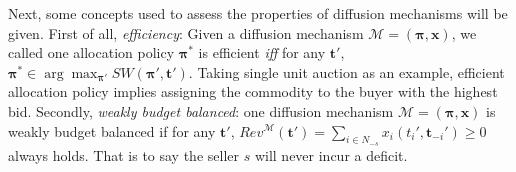 \documentclass{article}
\newtheorem{definition}{Definition}
\begin{document}
Next, some concepts used to assess the properties of diffusion mechanisms will be given. First of all, \textit{efficiency}: Given a diffusion mechanism $\mathcal{M}=(\boldsymbol{\pi},\mathbf{x})$, we called one allocation policy $\boldsymbol{\pi}^\ast$ is efficient \textit{iff} for any $\mathbf{t}'$, $\boldsymbol{\pi}^\ast \in \arg \max_{\boldsymbol{\pi}'} SW(\boldsymbol{\pi}',\mathbf{t}')$. Taking single unit auction as an example, efficient allocation policy implies assigning the commodity to the buyer with the highest bid. Secondly, \textit{weakly budget balanced}: one diffusion mechanism $\mathcal{M}=(\boldsymbol{\pi},\mathbf{x})$ is weakly budget balanced if for any $\mathbf{t}'$, $Rev^{\mathcal{M}}(\mathbf{t}')=\sum_{i\in N_{-s}}x_i(t_i',\mathbf{t}_{-i}')\geq 0$ always holds. That is to say the seller $s$ will never incur a deficit.

\end{document}
